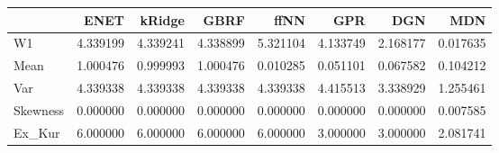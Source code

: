 \begin{tabular}{lrrrrrrr}
\toprule
{} &      ENET &    kRidge &      GBRF &      ffNN &       GPR &       DGN &       MDN \\
\midrule
W1       &  4.339199 &  4.339241 &  4.338899 &  5.321104 &  4.133749 &  2.168177 &  0.017635 \\
Mean     &  1.000476 &  0.999993 &  1.000476 &  0.010285 &  0.051101 &  0.067582 &  0.104212 \\
Var      &  4.339338 &  4.339338 &  4.339338 &  4.339338 &  4.415513 &  3.338929 &  1.255461 \\
Skewness &  0.000000 &  0.000000 &  0.000000 &  0.000000 &  0.000000 &  0.000000 &  0.007585 \\
Ex\_Kur   &  6.000000 &  6.000000 &  6.000000 &  6.000000 &  3.000000 &  3.000000 &  2.081741 \\
\bottomrule
\end{tabular}
